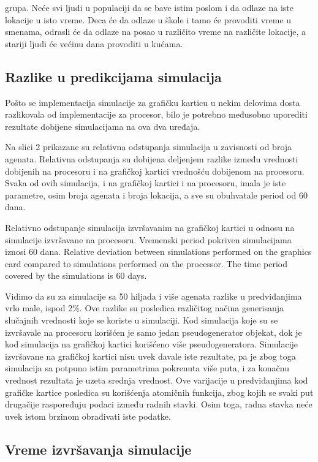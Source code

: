 grupa. Neće svi ljudi u populaciji da se bave istim poslom i da odlaze na iste lokacije u
isto vreme. Deca će da odlaze u škole i tamo će provoditi vreme u smenama, odrasli će
da odlaze na posao u različito vreme na različite lokacije, a stariji ljudi će većinu dana
provoditi u kućama.

\subsection{Razlike u predikcijama simulacija}

Pošto se implementacija simulacije za grafičku karticu u nekim delovima dosta
razlikovala od implementacije za procesor, bilo je potrebno međusobno uporediti
rezultate dobijene simulacijama na ova dva uređaja.

Na slici 2 prikazane su relativna odstupanja simulacija u zavisnosti od broja
agenata. Relativna odstupanja su dobijena deljenjem razlike između vrednosti dobijenih
na procesoru i na grafičkoj kartici vrednošću dobijenom na procesoru. Svaka od ovih
simulacija, i na grafičkoj kartici i na procesoru, imala je iste parametre, osim broja
agenata i broja lokacija, a sve su obuhvatale period od 60 dana.

    {Relativno odstupanje simulacija izvršavanim na grafičkoj kartici u odnosu na simulacije izvršavane na procesoru. Vremenski period pokriven simulacijama iznosi 60 dana.}
    {Relative deviation between simulations performed on the graphics card compared to simulations performed on the processor. The time period covered by the simulations is 60 days.}

Vidimo da su za simulacije sa 50 hiljada i više agenata razlike u predviđanjima
vrlo male, ispod 2\%. Ove razlike su posledica različitog načina generisanja slučajnih
vrednosti koje se koriste u simulaciji. Kod simulacija koje su se izvršavale na procesoru
korišćen je samo jedan pseudogenerator objekat, dok je kod simulacija na grafičkoj
kartici korišćeno više pseudogeneratora. Simulacije izvršavane na grafičkoj kartici nisu
uvek davale iste rezultate, pa je zbog toga simulacija sa potpuno istim parametrima
pokrenuta više puta, i za konačnu vrednost rezultata je uzeta srednja vrednost. Ove
varijacije u predviđanjima kod grafičke kartice posledica su korišćenja atomičnih
funkcija, zbog kojih se svaki put drugačije raspoređuju podaci između radnih stavki.
Osim toga, radna stavka neće uvek istom brzinom obrađivati iste podatke.

\subsection{Vreme izvršavanja simulacije}

